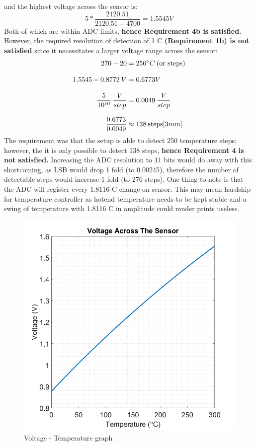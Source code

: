 and the highest voltage across the sensor is:
\begin{equation}
    5*\frac{2120.51}{2120.51+4700}= 1.5545 V
\end{equation}
Both of which are within ADC limits, \textbf{hence Requirement 4b is satisfied.} However, the required resolution of detection of 1 \degree C \textbf{(Requirement 1b) is not satisfied} since it necessitates a larger voltage range across the sensor:
\begin{align}
    270 - 20 &= 250 \degree C \: \text{(or steps)}\\[3mm]
    1.5545 - 0.8772 \: V &= 0.6773 V\\[3mm]
    \frac{5}{10^{10}} \: \frac{V}{step} &= 0.0049 \: \frac{V}{step}\\[3mm]
    \frac{0.6773}{0.0049} &\approx 138 \: \text{steps}[3mm]
\end{align}
The requirement was that the setup is able to detect 250 temperature steps; however, the it is only possible to detect 138 steps, \textbf{hence Requirement 4 is not satisfied.} Increasing the ADC resolution to 11 bits would do away with this shortcoming, as LSB would drop 1 fold (to 0.00245), therefore the number of detectable steps would increase 1 fold (to 276 steps). One thing to note is that the ADC will register every 1.8116 \degree C change on sensor. This may mean hardship for temperature controller as hotend temperature needs to be kept stable and a swing of temperature with 1.8116 \degree C in amplitude could render prints useless.
\begin{figure}[H]
    \centering
    \includegraphics[scale=0.4]{pics/ptc_temp_volt}
    \caption{Voltage - Temperature graph}
\end{figure}
